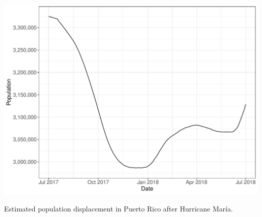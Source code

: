 \documentclass[11pt]{article}
\begin{document}
\begin{suppfigure}[ht]
	\centering
	\includegraphics[width=1\linewidth]{figs/supp-figure-7.pdf} 
	\caption{Estimated population displacement in Puerto Rico after Hurricane Mar\'ia.}
	\label{supp-fig:pop-displacement-pr}
\end{suppfigure}
\end{document}
